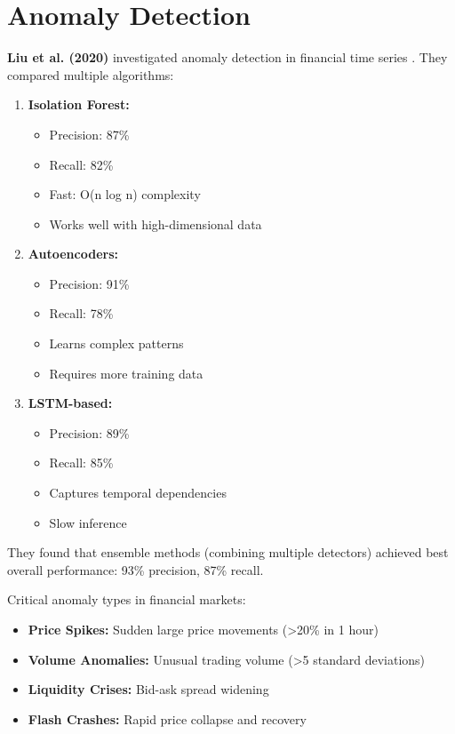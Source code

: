 \documentclass[conference]{IEEEtran}
\begin{document}
\section{Anomaly Detection}

\textbf{Liu et al. (2020)} investigated anomaly detection in financial time series \cite{liu2020anomaly}. They compared multiple algorithms:

\begin{enumerate}
    \item \textbf{Isolation Forest:}
    \begin{itemize}
        \item Precision: 87\%
        \item Recall: 82\%
        \item Fast: O(n log n) complexity
        \item Works well with high-dimensional data
    \end{itemize}
    
    \item \textbf{Autoencoders:}
    \begin{itemize}
        \item Precision: 91\%
        \item Recall: 78\%
        \item Learns complex patterns
        \item Requires more training data
    \end{itemize}
    
    \item \textbf{LSTM-based:}
    \begin{itemize}
        \item Precision: 89\%
        \item Recall: 85\%
        \item Captures temporal dependencies
        \item Slow inference
    \end{itemize}
\end{enumerate}

They found that ensemble methods (combining multiple detectors) achieved best overall performance: 93\% precision, 87\% recall.

Critical anomaly types in financial markets:
\begin{itemize}
    \item \textbf{Price Spikes:} Sudden large price movements (>20\% in 1 hour)
    \item \textbf{Volume Anomalies:} Unusual trading volume (>5 standard deviations)
    \item \textbf{Liquidity Crises:} Bid-ask spread widening
    \item \textbf{Flash Crashes:} Rapid price collapse and recovery
\end{itemize}
\end{document}

